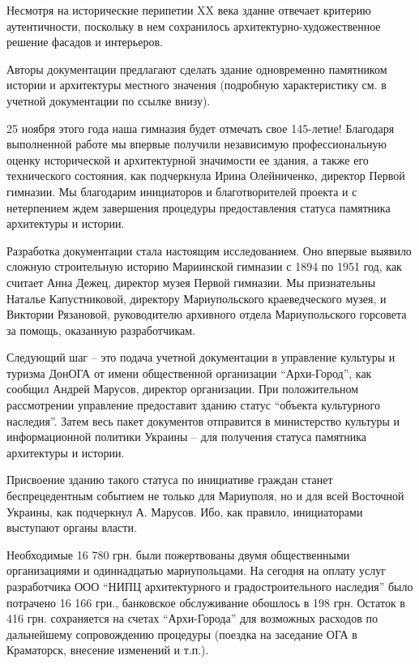 Несмотря на исторические перипетии XX века здание отвечает критерию
аутентичности, поскольку в нем сохранилось архитектурно-художественное решение
фасадов и интерьеров.

Авторы документации предлагают сделать здание одновременно памятником истории и
архитектуры местного значения (подробную характеристику см. в учетной
документации по ссылке внизу).

25 ноября этого года наша гимназия будет отмечать свое 145-летие! Благодаря
выполненной работе мы впервые получили независимую профессиональную оценку
исторической и архитектурной значимости ее здания, а также его технического
состояния, как подчеркнула Ирина Олейниченко, директор Первой гимназии. Мы
благодарим инициаторов и благотворителей проекта и с нетерпением ждем
завершения процедуры предоставления статуса памятника архитектуры и истории.

Разработка документации стала настоящим исследованием. Оно впервые выявило
сложную строительную историю Мариинской гимназии с 1894 по 1951 год, как
считает Анна Дежец, директор музея Первой гимназии. Мы признательны Наталье
Капустниковой, директору Мариупольского краеведческого музея, и Виктории
Рязановой, руководителю архивного отдела Мариупольского горсовета за помощь,
оказанную разработчикам. 

Следующий шаг – это подача учетной документации в управление культуры и туризма
ДонОГА от имени общественной организации \enquote{Архи-Город}, как сообщил Андрей
Марусов, директор организации. При положительном рассмотрении управление
предоставит зданию статус \enquote{объекта культурного наследия}. Затем весь пакет
документов отправится в министерство культуры и информационной политики Украины
– для получения статуса памятника архитектуры и истории.

Присвоение зданию такого статуса по инициативе граждан станет беспрецедентным
событием не только для Мариуполя, но и для всей Восточной Украины, как
подчеркнул А. Марусов. Ибо, как правило, инициаторами выступают органы власти.

Необходимые 16 780 грн. были пожертвованы двумя общественными организациями и
одиннадцатью мариупольцами. На сегодня на оплату услуг разработчика ООО \enquote{НИПЦ
архитектурного и градостроительного наследия} было потрачено 16 166 грн.,
банковское обслуживание обошлось в 198 грн. Остаток в 416 грн. сохраняется на
счетах \enquote{Архи-Города} для возможных расходов по дальнейшему сопровождению
процедуры (поездка на заседание ОГА в Краматорск, внесение изменений и т.п.). 

